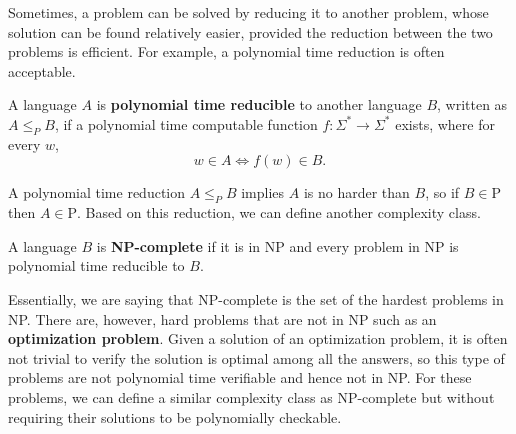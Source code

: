 \documentclass[../main.tex]{subfiles}
\begin{document}

Sometimes, a problem can be solved by reducing it to another problem, whose solution can be found relatively easier, provided the reduction between the two problems is efficient. For example, a polynomial time reduction is often acceptable.   

\begin{definition}
A language $A$ is \textbf{polynomial time reducible} 
\reversemarginpar
{}
to another language $B$, written as $A \le_P B$, if a polynomial time computable function $f:\Sigma^* \rightarrow \Sigma^*$ exists, where for every $w$, 
\begin{equation*}
    w \in A \iff f(w) \in B.
\end{equation*}
\end{definition}

A polynomial time reduction $A \le_P B$ implies $A$ is no harder than $B$, so if $B \in \text{P}$ then $A \in \text{P}$. Based on this reduction, we can define another complexity class. 

\begin{definition}
A language $B$ is \textbf{NP-complete} 
\reversemarginpar
{}
if it is in NP and every problem in NP is polynomial time reducible to $B$. 
\end{definition}
Essentially, we are saying that NP-complete is the set of the hardest problems in NP. There are, however, hard problems that are not in NP such as an \textbf{optimization problem}. Given a solution of an optimization problem, it is often not trivial to verify the solution is optimal among all the answers, so this type of problems are not polynomial time verifiable and hence not in NP. For these problems, we can define a similar complexity class as NP-complete but without requiring their solutions to be polynomially checkable. 
\end{document}

